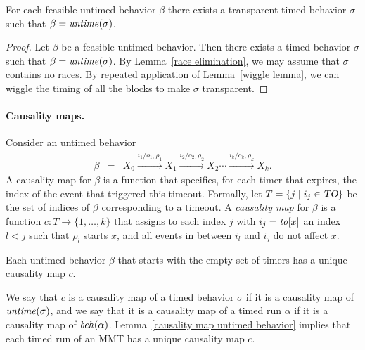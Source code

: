 \begin{lemma}
\label{lemma: transparent timed behavior}
For each feasible untimed behavior $\beta$ there exists
a transparent timed behavior $\sigma$ such that $\beta = \mathit{untime}(\sigma)$.
\end{lemma}
\iflong
\begin{proof}
Let $\beta$ be a feasible untimed behavior.
Then there exists a timed behavior $\sigma$ such that $\beta = \mathit{untime}(\sigma)$.
By Lemma~\ref{race elimination}, we may assume that $\sigma$ contains no races.
By repeated application of Lemma~\ref{wiggle lemma}, we can wiggle the timing of all the blocks to make $\sigma$ transparent.
\end{proof}
\fi

\iflong
\paragraph{Causality maps.} 
Consider an untimed behavior
\begin{eqnarray*}
\beta & = & X_0 \xrightarrow{i_1/o_1, \rho_1} X_1  \xrightarrow{i_2/o_2, \rho_2} X_2 \cdots \xrightarrow{i_k/o_k, \rho_k} X_{k}.
\end{eqnarray*}
A causality map for $\beta$ is a function that specifies, for each timer that expires, the index of the event that
triggered this timeout.
Formally, let $T = \{ j \mid i_j \in \mbox{\sl TO} \}$ be the set of indices of $\beta$ corresponding to a timeout.
A \emph{causality map} for $\beta$ is a function $c: T \rightarrow \{ 1 ,\ldots, k \}$ that assigns
to each index $j$ with $i_j = \mathit{to}[x]$ an index $l < j$ such that $\rho_l$ starts $x$, and all events in between $i_l$ and $i_j$
do not affect $x$.

\begin{lemma}
\label{causality map untimed behavior}
Each untimed behavior $\beta$ that starts with the empty set of timers has a unique causality map $c$.
\end{lemma}
We say that $c$ is a causality map of a timed behavior $\sigma$ if it is a causality map of $\mathit{untime}(\sigma)$,
and we say that it is a causality map of a timed run $\alpha$ if it is a causality map of $\mathit{beh}(\alpha)$.
Lemma~\ref{causality map untimed behavior} implies that each timed run of an MMT has a unique causality map $c$.

